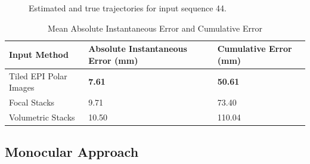 \begin{figure}[H]
{    }
    \caption{Estimated and true trajectories for input sequence 44.}
    \setcounter{subfigure}{0}
\end{figure}

\begin{table}[htbp]
    \caption{Mean Absolute Instantaneous Error and Cumulative Error}
    \centering
    \begin{tabular}{@{}lll@{}}
        \toprule
        Input Method        & Absolute Instantaneous Error (mm)  & Cumulative Error (mm)  \\
        \midrule 
        Tiled EPI Polar Images & \textbf{7.61} & \textbf{50.61} \\
        Focal Stacks & 9.71 & 73.40 \\
        Volumetric Stacks & 10.50 & 110.04 \\
        \bottomrule
        
    \end{tabular}
\end{table}


\subsection{Monocular Approach}

